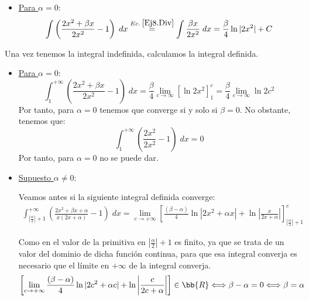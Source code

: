 \begin{ejercicio}
\begin{itemize}
        \item \underline{Para $\alpha = 0$}:
        \begin{equation*}
            \int \left(\frac{2x^2+\beta x}{2x^2}-1\right)\;dx
            \stackrel{Ec.\;\ref{Ej8.Div}}{=}
            \int \frac{\beta x}{2x^2}\;dx = \frac{\beta}{4}\ln |2x^2| + C
        \end{equation*}
    \end{itemize}
    
    \vspace{1cm}
    Una vez tenemos la integral indefinida, calculamos la integral definida.
    \begin{itemize}
        \item \underline{Para $\alpha = 0$}:
        \begin{equation*}
            \int_1^{+\infty} \left(\frac{2x^2+\beta x}{2x^2}-1\right)\;dx
            = \frac{\beta}{4}\lim_{c\to \infty} \left[\ln 2x^2\right]_1^c
            = \frac{\beta}{4}\lim_{c\to \infty}\ln 2c^2
        \end{equation*}
        Por tanto, para $\alpha=0$ tenemos que converge si y solo si $\beta = 0$. No obstante, tenemos que:
        \begin{equation*}
            \int_1^{+\infty} \left(\frac{2x^2}{2x^2}-1\right)\;dx = 0
        \end{equation*}
        Por tanto, para $\alpha = 0$ no se puede dar.


        \item \underline{Supuesto $\alpha \neq 0$}:

        Veamos antes si la siguiente integral definida converge:
        \begin{multline*}
           \int_{\left|\frac{\alpha}{2}\right|+1}^{+\infty} \left(\frac{2x^2+\beta x+\alpha}{x(2x+\alpha)}-1\right)\;dx
            = \lim_{c\to +\infty} \left[\frac{(\beta-\alpha)}{4}\ln |2x^2+\alpha x| +\ln \left|\frac{x}{2x+\alpha}\right|\right]_{\left|\frac{\alpha}{2}\right|+1}^{c}
       \end{multline*}

       Como en el valor de la primitiva en ${\left|\frac{\alpha}{2}\right|+1}$ es finito, ya que se trata de un valor del dominio de dicha función continua, para que esa integral converja es necesario que el límite en $+\infty$ de la integral converja.
       \begin{equation*}
           \left[\lim_{c\to +\infty} \frac{(\beta-\alpha)}{4}\ln |2c^2+\alpha c| +\ln \left|\frac{c}{2c+\alpha}\right|\right] \in \bb{R}\Longleftrightarrow \beta -\alpha = 0\Longleftrightarrow \beta = \alpha
       \end{equation*}


\end{itemize}
\end{ejercicio}
